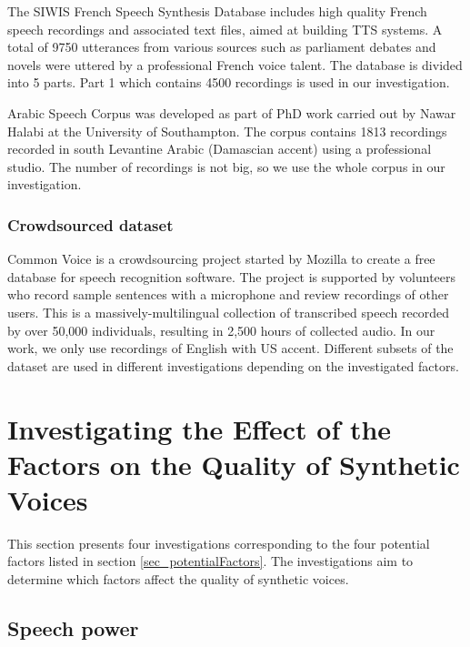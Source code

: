 \documentclass[12pt]{article}
\begin{document}
The SIWIS French Speech Synthesis Database \cite{siwis} includes high quality French speech recordings and associated text files, aimed at building TTS systems. A total of 9750 utterances from various sources such as parliament debates and novels were uttered by a professional French voice talent. The database is divided into 5 parts. Part 1 which contains 4500 recordings is used in our investigation.

Arabic Speech Corpus \cite{arabicCorpus} was developed as part of PhD work carried out by Nawar Halabi at the University of Southampton. The corpus contains 1813 recordings recorded in south Levantine Arabic (Damascian accent) using a professional studio. The number of recordings is not big, so we use the whole corpus in our investigation.

\subsubsection{Crowdsourced dataset}

Common Voice \cite{commonVoice} is a crowdsourcing project started by Mozilla to create a free database for speech recognition software. The project is supported by volunteers who record sample sentences with a microphone and review recordings of other users. This is a massively-multilingual collection of transcribed speech recorded by over 50,000 individuals, resulting in 2,500 hours of collected audio. In our work, we only use recordings of English with US accent. Different subsets of the dataset are used in different investigations depending on the investigated factors.



\clearpage
\section{Investigating the Effect of the Factors on the Quality of Synthetic Voices}\label{sec_investigations}
This section presents four investigations corresponding to the four potential factors listed in section {\ref{sec_potentialFactors}}. The investigations aim to determine which factors affect the quality of synthetic voices.

\subsection{Speech power}
\end{document}
